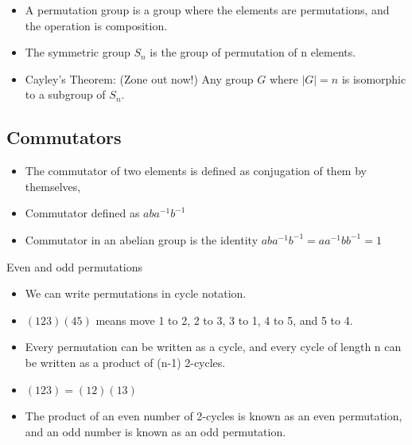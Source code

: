 \documentclass[xcolor=pdftex,dvipsnames,table]{beamer}
\begin{document}
\begin{frame}
  \begin{itemize}
    \item A permutation group is a group where the elements are permutations, and the operation is composition.
    \item The symmetric group $S_n$ is the group of permutation of n elements.
    \item Cayley's Theorem: (Zone out now!) Any group $G$ where $|G|=n$ is isomorphic to a subgroup of $S_n$.
  \end{itemize}
\end{frame}

\subsection{Commutators}
\begin{frame}
  \begin{itemize}
    \item The commutator of two elements is defined as conjugation of them by themselves,
    \item Commutator defined as $aba^{-1}b^{-1}$
    \item Commutator in an abelian group is the identity $aba^{-1}b^{-1} = aa^{-1}bb^{-1} = 1$
  \end{itemize}
\end{frame}

\begin{frame}
  Even and odd permutations
  \begin{itemize}
    \item We can write permutations in cycle notation. 
    \item $(123)(45)$ means move 1 to 2, 2 to 3, 3 to 1, 4 to 5, and 5 to 4.
    \item Every permutation can be written as a cycle, and every cycle of length n can be written as a product of (n-1) 2-cycles.
    \item $(123) = (12)(13)$
    \item The product of an even number of 2-cycles is known as an even permutation, and an odd number is known as an odd permutation.
  \end{itemize}
\end{frame}
\end{document}
